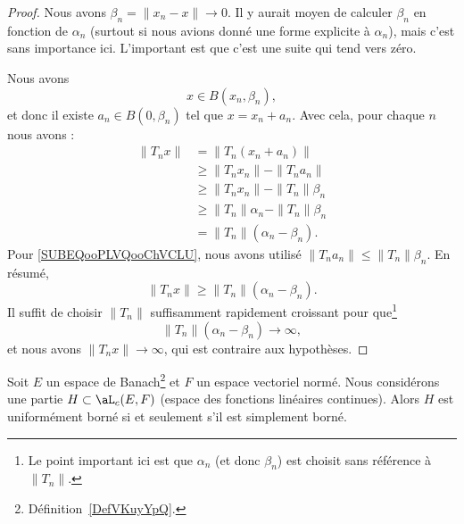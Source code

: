 \begin{proof}
    Nous avons \( \beta_n=\| x_n-x \|\to 0\). Il y aurait moyen de calculer \( \beta_n\) en fonction de \( \alpha_n\) (surtout si nous avions donné une forme explicite à \( \alpha_n\)), mais c'est sans importance ici. L'important est que c'est une suite qui tend vers zéro.

    Nous avons
    \begin{equation}
        x\in B(x_n,\beta_n),
    \end{equation}
    et donc il existe \( a_n\in B(0,\beta_n)\) tel que \( x=x_n+a_n\). Avec cela, pour chaque \( n\) nous avons :
    \begin{subequations}
        \begin{align}
            \| T_nx \|&=\| T_n(x_n+a_n) \|\\
            &\geq\| T_nx_n \|-\| T_na_n \|\\
            &\geq \| T_nx_n \|-\| T_n \|\beta_n     \label{SUBEQooPLVQooChVCLU}\\
        &\geq \| T_n \|\alpha_n-\| T_n \|\beta_n\\
        &=\| T_n \|(\alpha_n-\beta_n).
        \end{align}
    \end{subequations}
    Pour \ref{SUBEQooPLVQooChVCLU}, nous avons utilisé \( \| T_na_n \|\leq \| T_n \|\beta_n\). En résumé,
    \begin{equation}
        \| T_nx \|\geq \| T_n \|(\alpha_n-\beta_n).
    \end{equation}
    Il suffit de choisir \( \| T_n \|\) suffisamment rapidement croissant pour que\footnote{Le point important ici est que \( \alpha_n\) (et donc \( \beta_n\)) est choisit sans référence à \( \| T_n \|\).}
    \begin{equation}
       \| T_n \|(\alpha_n-\beta_n)\to \infty,
    \end{equation}
    et nous avons \( \| T_nx \|\to \infty\), qui est contraire aux hypothèses.
\end{proof}

\begin{theorem} \label{ThoPFBMHBN}
    Soit \( E\) un espace de Banach\footnote{Définition~\ref{DefVKuyYpQ}.} et \( F\) un espace vectoriel normé. Nous considérons une partie \( H\subset \aL_c(E,F)\) (espace des fonctions linéaires continues). Alors \( H\) est uniformément borné si et seulement s'il est simplement borné.
\end{theorem}


